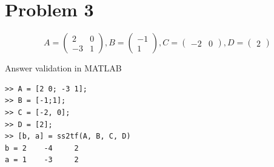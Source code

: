 \documentclass[a4paper,11pt]{article}
\makeatletter
\newcommand{\problemquestion}[1]{\gdef\@problemquestion{#1}}%
\newcommand{\problemsolution}[1]{\gdef\@problemsolution{#1}}%
\theoremstyle{mytheor}
\makeatother
\begin{document}
\section*{Problem 3}
$$A = \begin{pmatrix}
2 & 0\\ 
-3 & 1 
\end{pmatrix}, B = \begin{pmatrix}
-1\\ 
1 
\end{pmatrix}, C = \begin{pmatrix}
-2 & 0
\end{pmatrix}, D = \begin{pmatrix}
2
\end{pmatrix}$$
\begin{problem}
  \problemquestion{Find transfer function of the system.}
  \problemsolution{
    Using formula for converting SS to TF:
    $$Y(s) = \{C(sI - A)^{-1}B + D\}U(s)$$
    $$(sI - A) = \begin{pmatrix}
s - 2 & 0 \\
3 & s - 1
\end{pmatrix}$$
    $$(sI - A)^{-1} = \frac{1}{s^2-3s+2}\begin{pmatrix}
s - 1 & 0 \\
-3 & s - 2
\end{pmatrix}$$
$$C(sI - A)^{-1} = \frac{1}{s^2-3s+2}\begin{pmatrix}
2 - 2s & 0 \\
\end{pmatrix}$$
$$C(sI - A)^{-1}B = \begin{pmatrix}
\frac{2s - 2}{s^2-3s+2} \\
\end{pmatrix}$$
$$C(sI - A)^{-1}B + D = \begin{pmatrix}
\frac{2s^2-4s+2}{s^2-3s+2} \\
\end{pmatrix}$$
$$Answer: TF: \frac{2s^2-4s+2}{s^2-3s+2}$$
  }
\end{problem}

Answer validation in MATLAB
\begin{lstlisting}
>> A = [2 0; -3 1];
>> B = [-1;1];
>> C = [-2, 0];
>> D = [2];
>> [b, a] = ss2tf(A, B, C, D)
b = 2    -4     2
a = 1    -3     2
\end{lstlisting}
\end{document}
